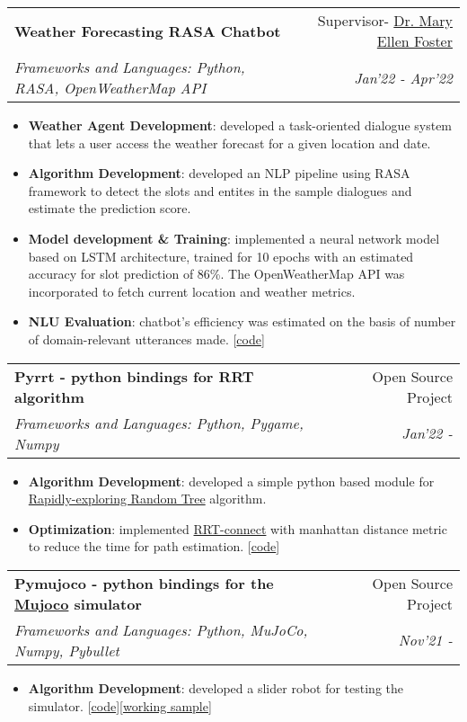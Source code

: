 \documentclass[a4paper,20pt]{article}
\makeatletter
\newcommand{\resumeItem}[2]{
  \item\small{
    \textbf{#1}{: #2 \vspace{-2pt}}
  }
}
\newcommand{\resumeSubheading}[4]{
  \vspace{-1pt}\item
    \begin{tabular*}{0.97\textwidth}{l@{\extracolsep{\fill}}r}
      \textbf{#1} & #2 \\
      \textit{#3} & \textit{#4} \\
    \end{tabular*}\vspace{-5pt}
}
\newcommand{\resumeItemListStart}{\begin{itemize}}
\newcommand{\resumeItemListEnd}{\end{itemize}\vspace{-5pt}}
\makeatother
\begin{document}
\vspace{5pt}
\resumeSubheading{Weather Forecasting RASA Chatbot}{Supervisor- \href{https://www.gla.ac.uk/schools/computing/staff/maryellenfoster/}{Dr. Mary Ellen Foster}}
   {Frameworks and Languages: Python, RASA, OpenWeatherMap API}{Jan'22 - Apr'22}
   \resumeItemListStart
      \resumeItem{Weather Agent Development}{developed a task-oriented dialogue system that lets a user access the weather forecast for a given location and date.}
      \resumeItem{Algorithm Development}{developed an NLP pipeline using RASA framework to detect the slots and entites in the sample dialogues and estimate the prediction score.}
      \resumeItem{Model development \& Training}{implemented a neural network model based on LSTM architecture, trained for 10 epochs with an estimated accuracy for slot prediction of 86\%. The OpenWeatherMap API was incorporated to fetch current location and weather metrics.}
      \resumeItem{NLU Evaluation}{chatbot's efficiency was estimated on the basis of number of domain-relevant utterances made.}\hspace{1pt}[\href{https://github.com/addy1997/conversational-interfaces}{code}]
     \resumeItemListEnd
     
\vspace{5pt}
\resumeSubheading{Pyrrt - python bindings for RRT algorithm}{Open Source Project}
   {Frameworks and Languages: Python, Pygame, Numpy}{Jan'22 -}
   \resumeItemListStart
      \resumeItem{Algorithm Development}{developed a simple python based module for \href{https://en.wikipedia.org/wiki/Rapidly-exploring_random_tree}{Rapidly-exploring Random Tree} algorithm.}
      \resumeItem{Optimization}{implemented \href{https://ieeexplore.ieee.org/document/844730}{RRT-connect} with manhattan distance metric to reduce the time for path estimation.}\hspace{1pt}[\href{https://github.com/addy1997/py-rrt}{code}]
     \resumeItemListEnd
    
\vspace{5pt}
\resumeSubheading{Pymujoco - python bindings for the \href{https://mujoco.org/}{Mujoco} simulator}{Open Source Project}
   {Frameworks and Languages: Python, MuJoCo, Numpy, Pybullet}{Nov'21 -}
   \resumeItemListStart
      \resumeItem{Algorithm Development}{developed a slider robot for testing the simulator.}\hspace{1pt}[\href{https://github.com/erwincoumans/pymujoco}{code}][\href{https://colab.research.google.com/drive/1jJfwcBDRcY3oXLawX2HLDFTDOIyHNdKQ?usp=sharing#scrollTo=bGsnOkHHUawH}{working sample}]
     \resumeItemListEnd
     
\end{document}
